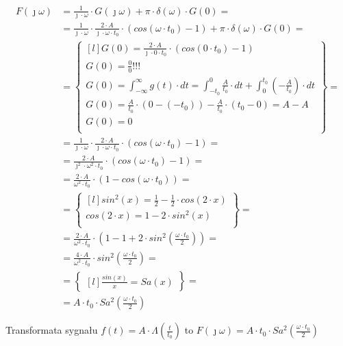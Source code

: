 \begin{task}
\begin{align*}
F(\jmath \omega)&= \frac{1}{\jmath \cdot \omega} \cdot G(\jmath \omega) + \pi \cdot \delta(\omega) \cdot G(0)=\\
&=\frac{1}{\jmath \cdot \omega} \cdot \frac{2 \cdot A}{\jmath \cdot \omega \cdot t_{0}} \cdot \left(cos(\omega \cdot t_{0}) -1\right) + \pi \cdot \delta(\omega) \cdot G(0)=\\
&=\begin{Bmatrix*}[l]
G(0)=\frac{2 \cdot A}{\jmath \cdot 0 \cdot t_{0}} \cdot \left(cos(0 \cdot t_{0}) -1\right)\\
G(0)=\frac{0}{0}!!!\\
G(0)=\int_{-\infty}^{\infty} g(t) \cdot dt=\int_{-t_{0}}^{0} \frac{A}{t_{0}} \cdot dt+\int_{0}^{t_{0}} (-\frac{A}{t_{0}}) \cdot dt\\
G(0)=\frac{A}{t_{0}} \cdot (0 -(-t_{0}))-\frac{A}{t_{0}} \cdot (t_{0} - 0)= A- A\\
G(0)=0\\
\end{Bmatrix*}=\\
&=\frac{1}{\jmath \cdot \omega} \cdot \frac{2 \cdot A}{\jmath \cdot \omega \cdot t_{0}} \cdot \left(cos(\omega \cdot t_{0}) -1\right)=\\
&=\frac{2 \cdot A}{\jmath^{2} \cdot \omega^{2} \cdot t_{0}} \cdot \left(cos(\omega \cdot t_{0}) -1\right)=\\
&=\frac{2 \cdot A}{\omega^{2} \cdot t_{0}} \cdot \left(1 - cos(\omega \cdot t_{0})\right)=\\
&=\begin{Bmatrix*}[l]
sin^{2}(x)= \frac{1}{2}-\frac{1}{2} \cdot cos(2 \cdot x)\\
cos(2 \cdot x)= 1 - 2 \cdot sin^{2}(x)\\
\end{Bmatrix*}=\\
&=\frac{2 \cdot A}{\omega^{2} \cdot t_{0}} \cdot \left(1 - 1 + 2 \cdot sin^{2}\left(\frac{\omega \cdot t_{0}}{2}\right)\right)=\\
&=\frac{4 \cdot A}{\omega^{2} \cdot t_{0}} \cdot sin^{2}\left(\frac{\omega \cdot t_{0}}{2}\right)=\\
&=\begin{Bmatrix*}[l]
\frac{sin(x)}{x}=Sa(x)
\end{Bmatrix*}=\\
&=A \cdot t_{0} \cdot Sa^{2}(\frac{\omega \cdot t_{0}}{2})
\end{align*}

Transformata sygnału $f(t) = A \cdot \Lambda(\frac{t}{t_{0}})$ to $F(\jmath \omega)=A \cdot t_{0} \cdot Sa^{2}(\frac{\omega \cdot t_{0}}{2})$

\end{task}
